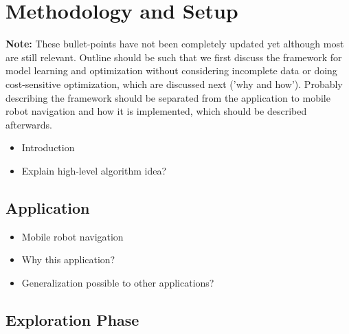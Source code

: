 \chapter{Methodology and Setup}
\label{ch:setup}

\textbf{Note:} These bullet-points have not been completely updated yet although most are still relevant. Outline should be such that we first discuss the framework for model learning and optimization without considering incomplete data or doing cost-sensitive optimization, which are discussed next ('why and how').
Probably describing the framework should be separated from the application to mobile robot navigation and how it is implemented, which should be described afterwards.

\begin{itemize}
	\item Introduction
	\item Explain high-level algorithm idea?
\end{itemize}

\section{Application}
\label{sec:application}

% 

\begin{itemize}
	\item Mobile robot navigation
	\item Why this application?
	\item Generalization possible to other applications?
\end{itemize}

\section{Exploration Phase}
\label{sec:exploration-phase}

% 

